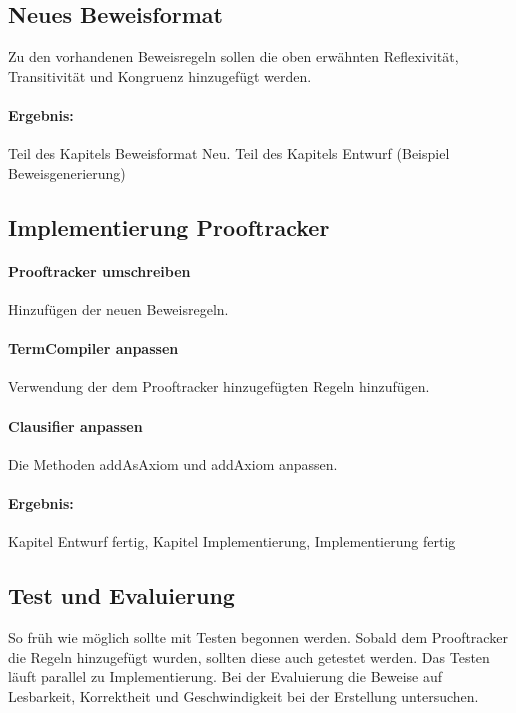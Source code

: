 \documentclass[a4paper]{article}
\begin{document}
\subsection{Neues Beweisformat}

Zu den vorhandenen Beweisregeln sollen die oben erwähnten Reflexivität, Transitivität und Kongruenz hinzugefügt werden.

\paragraph{Ergebnis:}
Teil des Kapitels Beweisformat Neu.
Teil des Kapitels Entwurf (Beispiel Beweisgenerierung)


\subsection{Implementierung Prooftracker}

\paragraph{Prooftracker umschreiben}

Hinzufügen der neuen Beweisregeln.

\paragraph{TermCompiler anpassen}

Verwendung der dem Prooftracker hinzugefügten Regeln hinzufügen.

\paragraph{Clausifier anpassen}

Die Methoden addAsAxiom und addAxiom anpassen.

\paragraph{Ergebnis:}
Kapitel Entwurf fertig, Kapitel Implementierung, Implementierung fertig

\subsection{Test und Evaluierung}

So früh wie möglich sollte mit Testen begonnen werden.
Sobald dem Prooftracker die Regeln hinzugefügt wurden, sollten diese auch getestet werden.
Das Testen läuft parallel zu Implementierung.
Bei der Evaluierung die Beweise auf Lesbarkeit, Korrektheit und Geschwindigkeit bei der Erstellung untersuchen.
\end{document}
